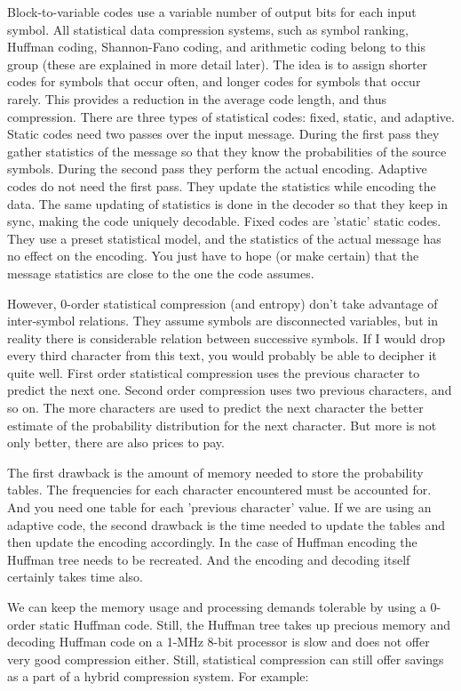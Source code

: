 Block-to-variable codes use a variable number of output bits for each input symbol. All statistical data compression systems, such as symbol ranking, Huffman coding, Shannon-Fano coding, and arithmetic coding belong to this group (these are explained in more detail later). The idea is to assign shorter codes for symbols that occur often, and longer codes for symbols that occur rarely. This provides a reduction in the average code length, and thus compression.
There are three types of statistical codes: fixed, static, and adaptive. Static codes need two passes over the input message. During the first pass they gather statistics of the message so that they know the probabilities of the source symbols. During the second pass they perform the actual encoding. Adaptive codes do not need the first pass. They update the statistics while encoding the data. The same updating of statistics is done in the decoder so that they keep in sync, making the code uniquely decodable. Fixed codes are 'static' static codes. They use a preset statistical model, and the statistics of the actual message has no effect on the encoding. You just have to hope (or make certain) that the message statistics are close to the one the code assumes.

However, 0-order statistical compression (and entropy) don't take advantage of inter-symbol relations. 
They assume symbols are disconnected variables, but in reality there is considerable relation between successive symbols. If I would drop every third character from this text, you would probably be able to decipher it quite well. First order statistical compression uses the previous character to predict the next one. Second order compression uses two previous characters, and so on. The more characters are used to predict the next character the better estimate of the probability distribution for the next character. But more is not only better, there are also prices to pay.

The first drawback is the amount of memory needed to store the probability tables. The frequencies for each character encountered must be accounted for. And you need one table for each 'previous character' value. If we are using an adaptive code, the second drawback is the time needed to update the tables and then update the encoding accordingly. In the case of Huffman encoding the Huffman tree needs to be recreated. And the encoding and decoding itself certainly takes time also.

We can keep the memory usage and processing demands tolerable by using a 0-order static Huffman code. 
Still, the Huffman tree takes up precious memory and decoding Huffman code on a 1-MHz 8-bit processor is slow and does not offer very good compression either. Still, statistical compression can still offer savings as a part of a hybrid compression system. For example:

